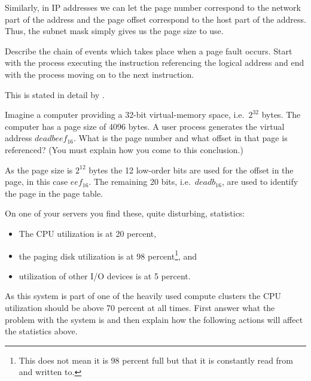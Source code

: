 \documentclass[a4paper]{miunasgn}
\begin{document}
\begin{questions}
\begin{solution}
		Similarly, in IP addresses we can let the page number correspond to the 
		network part of the address and the page offset correspond to the host part 
		of the address.
		Thus, the subnet mask simply gives us the page size to use.
	\end{solution}

	
	\question\label{q:pagefaults}
	Describe the chain of events which takes place when a page fault occurs.
	Start with the process executing the instruction referencing the logical 
	address and end with the process moving on to the next instruction.
	\begin{solution}
		This is stated in detail by \citet[pp. 365-366]{Silberschatz2009osc}.
	\end{solution}

	\question\label{q:translatingaddresses}
	Imagine a computer providing a 32-bit virtual-memory space, i.e.\ \(2^{32}\) 
	bytes.
	The computer has a page size of 4096 bytes.
	A user process generates the virtual address \(deadbeef_{16}\).
	What is the page number and what offset in that page is referenced?
	(You must explain how you come to this conclusion.)
	\begin{solution}
		As the page size is \(2^{12}\) bytes the 12 low-order bits are used for the 
		offset in the page, in this case \(eef_{16}\).
		The remaining 20 bits, i.e.\ \(deadb_{16}\), are used to identify the page 
		in the page table.
	\end{solution}

	\question\label{q:thrashing}
	On one of your servers you find these, quite disturbing, statistics:
	\begin{itemize}
		\item The CPU utilization is at 20 percent,
		\item the paging disk utilization is at 98 percent\footnote{%
				This does not mean it is 98 percent full but that it is constantly read 
				from and written to.
			}, and
		\item utilization of other I/O devices is at 5 percent.
	\end{itemize}
	As this system is part of one of the heavily used compute clusters the CPU 
	utilization should be above 70 percent at all times.
	First answer what the problem with the system is and then explain how the 
	following actions will affect the statistics above.
\end{questions}
\end{document}
